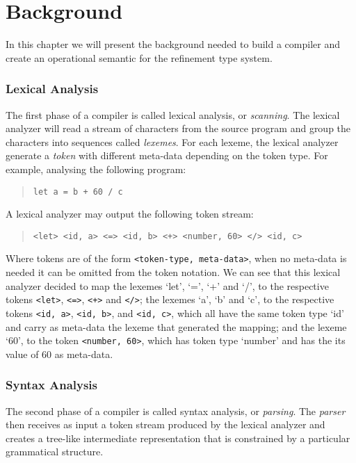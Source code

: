 \documentclass[
    oneside,
    english,
    embeddedlogo,
    noabntexcite
]{ufsc-thesis-rn46-2019}
\begin{document}
\chapter{Background}\label{chapter:background}

In this chapter we will present the background needed to build a compiler and create an operational semantic for the refinement type system.

\subsection{Lexical Analysis}

The first phase of a compiler is called lexical analysis, or \textit{scanning}.
The lexical analyzer will read a stream of characters from the source program and group the characters into sequences called \textit{lexemes}.
For each lexeme, the lexical analyzer generate a \textit{token} with different meta-data depending on the token type.
For example, analysing the following program:
\begin{quote}
    \begin{verbatim}
let a = b + 60 / c
\end{verbatim}
\end{quote}
A lexical analyzer may output the following token stream:
\begin{quote}\label{figure:introduction_token_stream}
    \begin{verbatim}
<let> <id, a> <=> <id, b> <+> <number, 60> </> <id, c>
\end{verbatim}
\end{quote}
Where tokens are of the form \verb+<token-type, meta-data>+, when no meta-data is needed it can be omitted from the token notation.
We can see that this lexical analyzer decided to map the lexemes `let', `=', `+' and `/', to the respective tokens \verb+<let>+, \verb+<=>+, \verb-<+>- and \verb+</>+;
the lexemes `a', `b' and `c', to the respective tokens \verb+<id, a>+, \verb+<id, b>+, and \verb+<id, c>+, which all have the same token type `id' and carry as meta-data the lexeme that generated the mapping; and the lexeme `60', to the token \verb+<number, 60>+, which has token type `number' and has the its value of $60$ as meta-data.
\subsection{Syntax Analysis}

The second phase of a compiler is called syntax analysis, or \textit{parsing}.
The \textit{parser} then receives as input a token stream produced by the lexical analyzer and creates a tree-like intermediate representation that is constrained by a particular grammatical structure.
\end{document}
